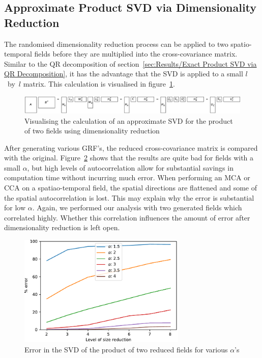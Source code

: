 \documentclass[ijgi,article,submit,moreauthors,pdftex,10pt,a4paper]{Definitions/mdpi}
\begin{document}
\subsection{Approximate Product SVD via Dimensionality Reduction}
\label{sec:Results/Approximate Product SVD via Dimensionality Reduction}

The randomised dimensionality reduction process can be applied to two spatio-temporal fields before they are multiplied into the cross-covariance matrix. Similar to the QR decomposition of section~\ref{sec:Results/Exact Product SVD via QR Decomposition}, it has the advantage that the SVD is applied to a small $l$~by~$l$ matrix. This calculation is visualised in figure~\ref{fig:randomisedSquareProductSVD}.

\begin{figure}[H]
\centering
\includegraphics[width=\textwidth]{Results/randomisedSquareProductSVD.pdf}
\caption[Approximate product SVD]{Visualising the calculation of an approximate SVD for the product of two fields using dimensionality reduction}
\label{fig:randomisedSquareProductSVD}
\end{figure}

After generating various GRF's, the reduced cross-covariance matrix is compared with the original. Figure~\ref{fig:plotRandomisedSizeReducedMatrixProduct} shows that the results are quite bad for fields with a small $\alpha$, but high levels of autocorrelation allow for substantial savings in computation time without incurring much error. When performing an MCA or CCA on a spatiao-temporal field, the spatial directions are flattened and some of the spatial autocorrelation is lost. This may explain why the error is substantial for low $\alpha$. Again, we performed our analysis with two generated fields which correlated highly. Whether this correlation influences the amount of error after dimensionality reduction is left open.

\begin{figure}[H]
\centering
\includegraphics[width=80mm]{Results/plotRandomisedSizeReducedMatrixProduct.pdf}
\caption[Error after reduction]{Error in the SVD of the product of two reduced fields for various $\alpha$'s}
\label{fig:plotRandomisedSizeReducedMatrixProduct}
\end{figure}
\end{document}
